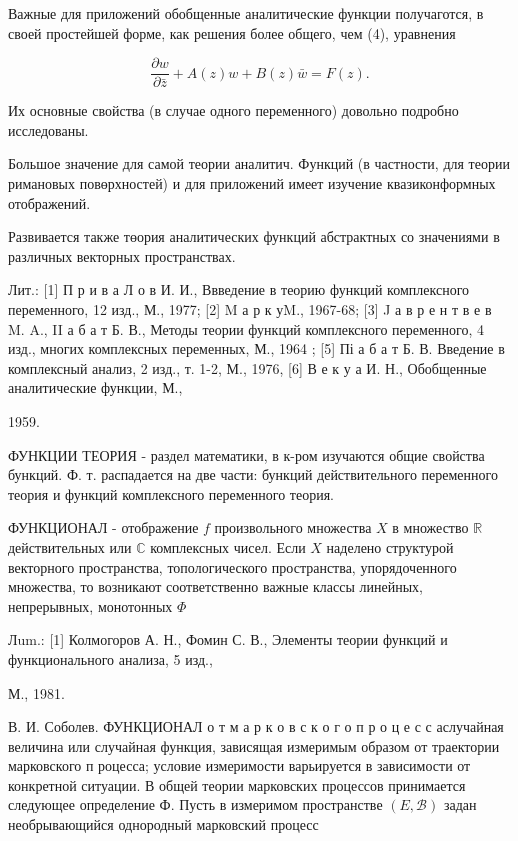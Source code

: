 \documentclass[10pt]{article}
\begin{document}
Важные для приложений обобщенные аналитические функции получаготся, в своей простейшей форме, как решения более общего, чем (4), уравнения



\[

\frac{\partial w}{\partial \bar{z}}+A(z) w+B(z) \bar{w}=F(z) .

\]



Их основные свойства (в случае одного переменного) довольно подробно исследованы.



Большое значение для самой теории аналитич. Функций (в частности, для теории римановых повөрхностей) и для приложений имеет изучение квазиконформных отображений.



Развивается также төория аналитических функций абстрактных со значениями в различных векторных пространствах.



Лит.: [1] П р и в а Л о в И. И., Ввведение в теорию функций комплексного переменного, 12 изд., М., 1977; [2] M а р к уM., 1967-68; [3] J а в р е н т в е в M. A., II а б а т Б. В., Методы теории функций комплексного переменного, 4 изд., многих комплексных переменных, М., 1964 ; [5] Пі а б а т Б. В. Введение в комплексный анализ, 2 изд., т. 1-2, М., 1976, [6] В е к у а И. Н., Обобщенные аналитические функции, М.,

1959.



ФУНКЦИИ ТЕОРИЯ - раздел математики, в к-ром изучаются общие свойства бункций. Ф. т. распадается на две части: бункций действительного переменного теория и функций комплексного переменного теория.



ФУНКЦИОНАЛ - отображение $f$ произвольного множества $X$ в множество $\mathbb{R}$ действительных или $\mathbb{C}$ комплексных чисел. Если $X$ наделено структурой векторного пространства, топологического пространства, упорядоченного множества, то возникают соответственно важные классы линейных, непрерывных, монотонных $\Phi$



Лum.: [1] Колмогоров А. Н., Фомин С. В., Элементы теории функций и функционального анализа, 5 изд.,

М., 1981.

В. И. Соболев. ФУНКЦИОНАЛ о т м а р к о в с к о г о п р о ц е с с аслучайная величина или случайная функция, зависящая измеримым образом от траектории марковского п роцесса; условие измеримости варьируется в зависимости от конкретной ситуации. В общей теории марковских процессов принимается следующее определение Ф. Пусть в измеримом пространстве $(E, \mathscr{B})$ задан необрывающийся однородный марковский процесс
\end{document}
